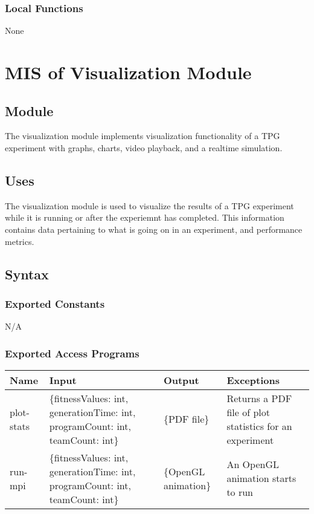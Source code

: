 \documentclass[12pt, titlepage]{article}
\begin{document}
\subsubsection{Local Functions}
None

\section{MIS of Visualization Module} \label{Visualization Module}

\subsection{Module}
The visualization module implements visualization functionality of a TPG experiment with graphs, charts, video playback, and a realtime simulation.

\subsection{Uses}
The visualization module is used to visualize the results of a TPG experiment while it is running or after the experiemnt has completed. This information contains data pertaining to what is going on in an experiment, and performance metrics.

\subsection{Syntax}

\subsubsection{Exported Constants}
N/A

\subsubsection{Exported Access Programs}
\begin{center}
  \begin{tabular}{p{2cm} p{4cm} p{4cm} p{4cm}}
  \hline
  \textbf{Name} & \textbf{Input} & \textbf{Output} & \textbf{Exceptions} \\
  \hline
  plot-stats & \{fitnessValues: int, generationTime: int, programCount: int, teamCount: int\} & \{PDF file\} & Returns a PDF file of plot statistics for an experiment \\
  \hline
  run-mpi & \{fitnessValues: int, generationTime: int, programCount: int, teamCount: int\} & \{OpenGL animation\} & An OpenGL animation starts to run \\
  \hline
  
  \end{tabular}
  
  \end{center}
\end{document}
